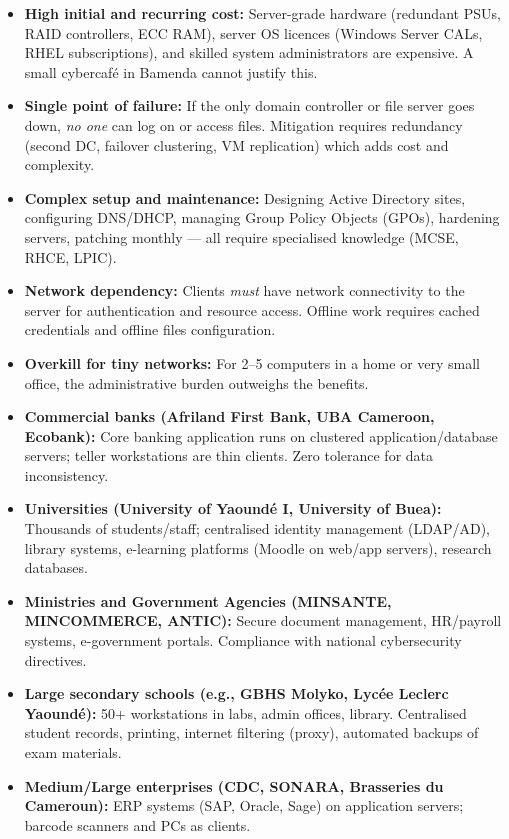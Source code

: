\documentclass[11pt]{article}
\newcounter{popsec}
\newcounter{popsub}
\newcommand{\courssub}[1]{%
  \stepcounter{popsub}%
  \par\vspace{9pt}\noindent{\popxbold\fontsize{11.5}{13}\selectfont\color{popink}{\color{poporange}\thepopsec.\thepopsub}\hspace{6pt}#1}\par\nopagebreak\vspace{4pt}
}
\begin{document}
\begin{aretenir}
\begin{itemize}
\item \textbf{High initial and recurring cost:} Server-grade hardware (redundant PSUs, RAID controllers, ECC RAM), server OS licences (Windows Server CALs, RHEL subscriptions), and skilled system administrators are expensive. A small cybercafé in Bamenda cannot justify this.
\item \textbf{Single point of failure:} If the only domain controller or file server goes down, \emph{no one} can log on or access files. Mitigation requires redundancy (second DC, failover clustering, VM replication) which adds cost and complexity.
\item \textbf{Complex setup and maintenance:} Designing Active Directory sites, configuring DNS/DHCP, managing Group Policy Objects (GPOs), hardening servers, patching monthly — all require specialised knowledge (MCSE, RHCE, LPIC).
\item \textbf{Network dependency:} Clients \emph{must} have network connectivity to the server for authentication and resource access. Offline work requires cached credentials and offline files configuration.
\item \textbf{Overkill for tiny networks:} For 2--5 computers in a home or very small office, the administrative burden outweighs the benefits.
\end{itemize}
\end{aretenir}

\courssub{Suitable Contexts and Hybrid Situations}

\begin{exemplebox}
\begin{itemize}
\item \textbf{Commercial banks (Afriland First Bank, UBA Cameroon, Ecobank):} Core banking application runs on clustered application/database servers; teller workstations are thin clients. Zero tolerance for data inconsistency.
\item \textbf{Universities (University of Yaoundé I, University of Buea):} Thousands of students/staff; centralised identity management (LDAP/AD), library systems, e-learning platforms (Moodle on web/app servers), research databases.
\item \textbf{Ministries and Government Agencies (MINSANTE, MINCOMMERCE, ANTIC):} Secure document management, HR/payroll systems, e-government portals. Compliance with national cybersecurity directives.
\item \textbf{Large secondary schools (e.g., GBHS Molyko, Lycée Leclerc Yaoundé):} 50+ workstations in labs, admin offices, library. Centralised student records, printing, internet filtering (proxy), automated backups of exam materials.
\item \textbf{Medium/Large enterprises (CDC, SONARA, Brasseries du Cameroun):} ERP systems (SAP, Oracle, Sage) on application servers; barcode scanners and PCs as clients.
\end{itemize}
\end{exemplebox}
\end{document}
